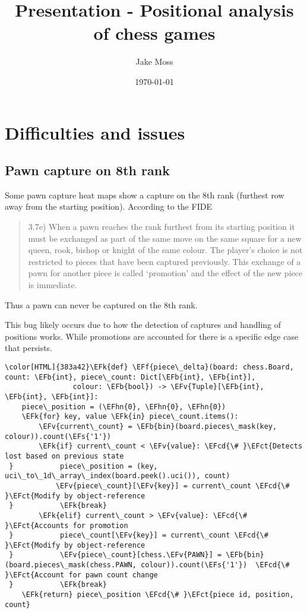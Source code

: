 \documentclass[bigger]{beamer}
\author{Jake Moss}
\date{\today}
\title{Presentation - Positional analysis of chess games}
\newcommand{\EFk}[1]{\textcolor{EFk}{#1}} %
\newcommand{\EFs}[1]{\textcolor{EFs}{#1}} %
\newcommand{\EFb}[1]{\textcolor{EFb}{#1}} %
\newcommand{\EFct}[1]{\textcolor{EFct}{#1}} %
\newcommand{\EFv}[1]{\textcolor{EFv}{#1}} %
\newcommand{\EFf}[1]{\textcolor{EFf}{#1}} %
\newcommand{\EFcd}[1]{\textcolor{EFcd}{#1}} %
\newcommand{\EFhn}[1]{\textcolor{EFhn}{\textbf{#1}}} %
\begin{document}
\maketitle
\tableofcontents

\section{Difficulties and issues}
\label{sec:org19efe09}
\subsection{Pawn capture on 8th rank}
\label{sec:org2e33045}
Some pawn capture heat maps show a capture on the 8th rank (furthest row away from the starting position). According to the FIDE
\begin{quote}
3.7e) When  a  pawn  reaches  the  rank  furthest  from  its  starting  position  it  must  be  exchanged  as  part  of  the  same  move  on  the  same  square  for  a  new queen,  rook,  bishop  or  knight  of  the  same  colour.  The  player’s  choice  is  not  restricted  to  pieces  that  have  been  captured  previously.  This  exchange  of  a  pawn  for  another  piece  is  called ‘promotion’ and the effect of the new piece is immediate.
\cite{FIDE}
\end{quote}
Thus a pawn can never be captured on the 8th rank.

This bug likely occurs due to how the detection of captures and handling of positions works. While promotions are accounted for there is a specific edge case that persists.

\begin{Code}
\begin{Verbatim}[]
\color[HTML]{383a42}\EFk{def} \EFf{piece\_delta}(board: chess.Board, count: \EFb{int}, piece\_count: Dict[\EFb{int}, \EFb{int}],
                colour: \EFb{bool}) -> \EFv{Tuple}[\EFb{int}, \EFb{int}, \EFb{int}]:
    piece\_position = (\EFhn{0}, \EFhn{0}, \EFhn{0})
    \EFk{for} key, value \EFk{in} piece\_count.items():
        \EFv{current\_count} = \EFb{bin}(board.pieces\_mask(key, colour)).count(\EFs{'1'})
        \EFk{if} current\_count < \EFv{value}: \EFcd{\# }\EFct{Detects lost based on previous state
 }           piece\_position = (key, uci\_to\_1d\_array\_index(board.peek().uci()), count)
            \EFv{piece\_count}[\EFv{key}] = current\_count \EFcd{\# }\EFct{Modify by object-reference
 }           \EFk{break}
        \EFk{elif} current\_count > \EFv{value}: \EFcd{\# }\EFct{Accounts for promotion
 }           piece\_count[\EFv{key}] = current\_count \EFcd{\# }\EFct{Modify by object-reference
 }           \EFv{piece\_count}[chess.\EFv{PAWN}] = \EFb{bin}(board.pieces\_mask(chess.PAWN, colour)).count(\EFs{'1'})  \EFcd{\# }\EFct{Account for pawn count change
 }           \EFk{break}
    \EFk{return} piece\_position \EFcd{\# }\EFct{piece id, position, count}
\end{Verbatim}
\end{Code}
\end{document}
